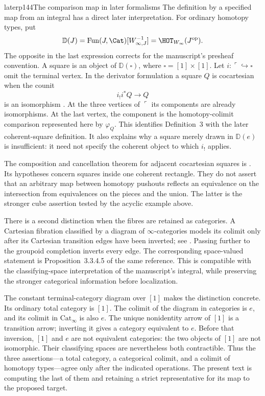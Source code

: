 \begin{dcomment}{later}{p144}{The comparison map in later formalisms}
The definition by a specified map from an integral has a direct later interpretation. For ordinary homotopy types, put
\[
 \mathbb D(J)=\operatorname{Fun}(J,\Cat)[W_{\infty,J}^{-1}]
             =\HOT_{W_\infty}(J^{\mathrm{op}}).
\]
The opposite in the last expression corrects for the manuscript's presheaf convention. A square is an object of $\mathbb D(\square)$, where $\square=[1]\times[1]$. Let $i:\ulcorner\hookrightarrow\square$ omit the terminal vertex. In the derivator formulation a square $Q$ is cocartesian when the counit
\[
                   i_!i^*Q\longrightarrow Q
\]
is an isomorphism \citep[Definition~3.9]{Groth2013}. At the three vertices of $\ulcorner$ its components are already isomorphisms. At the last vertex, the component is the homotopy-colimit comparison represented here by $\varphi_Q$. This identifies Definition~3 with the later coherent-square definition. It also explains why a square merely drawn in $\mathbb D(e)$ is insufficient: it need not specify the coherent object to which $i_!$ applies.

The composition and cancellation theorem for adjacent cocartesian squares is \citet[Proposition~3.13]{Groth2013}. Its hypotheses concern squares inside one coherent rectangle. They do not assert that an arbitrary map between homotopy pushouts reflects an equivalence on the intersection from equivalences on the pieces and the union. The latter is the stronger cube assertion tested by the acyclic example above.

There is a second distinction when the fibres are retained as categories. A Cartesian fibration classified by a diagram of $\infty$-categories models its colimit only after its Cartesian transition edges have been inverted; see \citet[Corollary~3.3.4.3 and Warning~3.3.4.4]{Lurie2009HTT}. Passing further to the groupoid completion inverts every edge. The corresponding space-valued statement is Proposition~3.3.4.5 of the same reference. This is compatible with the classifying-space interpretation of the manuscript's integral, while preserving the stronger categorical information before localization.

The constant terminal-category diagram over $[1]$ makes the distinction concrete. Its ordinary total category is $[1]$. The colimit of the diagram in categories is $e$, and its colimit in $\mathrm{Cat}_\infty$ is also $e$. The unique nonidentity arrow of $[1]$ is a transition arrow; inverting it gives a category equivalent to $e$. Before that inversion, $[1]$ and $e$ are not equivalent categories: the two objects of $[1]$ are not isomorphic. Their classifying spaces are nevertheless both contractible. Thus the three assertions---a total category, a categorical colimit, and a colimit of homotopy types---agree only after the indicated operations. The present text is computing the last of them and retaining a strict representative for its map to the proposed target.
\end{dcomment}

